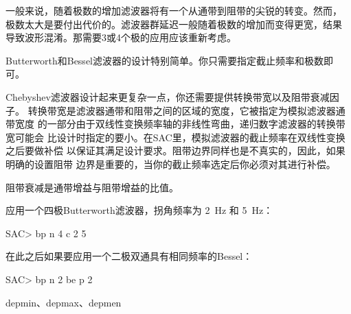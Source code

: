 一般来说，随着极数的增加滤波器将有一个从通带到阻带的尖锐的转变。然而，
极数太大是要付出代价的。滤波器群延迟一般随着极数的增加而变得更宽，结果
导致波形混淆。那需要3或4个极的应用应该重新考虑。

Butterworth和Bessel滤波器的设计特别简单。你只需要指定截止频率和极数即可。

Chebyshev滤波器设计起来更复杂一点，你还需要提供转换带宽以及阻带衰减因子。
转换带宽是滤波器通带和阻带之间的区域的宽度，它被指定为模拟滤波器通带宽度
的一部分由于双线性变换频率轴的非线性弯曲，递归数字滤波器的转换带宽可能会
比设计时指定的要小。在SAC里，模拟滤波器的截止频率在双线性变换之后要做补偿
以保证其满足设计要求。阻带边界同样也是不真实的，因此，如果明确的设置阻带
边界是重要的，当你的截止频率选定后你必须对其进行补偿。

阻带衰减是通带增益与阻带增益的比值。

应用一个四极Butterworth滤波器，拐角频率为 \SI{2}{\Hz} 和 \SI{5}{\Hz}：
\begin{SACCode}
SAC> bp n 4 c 2 5
\end{SACCode}

在此之后如果要应用一个二极双通具有相同频率的Bessel：
\begin{SACCode}
SAC> bp n 2 be p 2
\end{SACCode}

depmin、depmax、depmen
